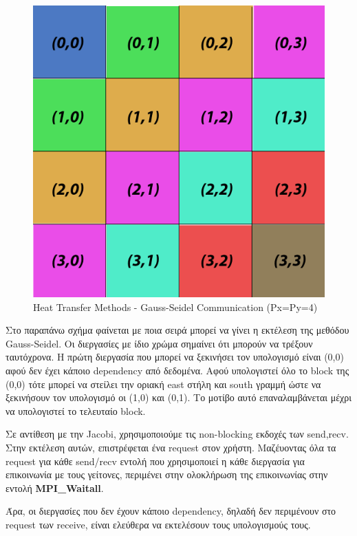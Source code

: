 \documentclass[../final_report.tex]{subfiles}
\begin{document}
\begin{figure}[H]
    \centering
    \includegraphics[scale=0.70]{gauss-seidel-comm.png}
    \caption{Heat Transfer Methods - Gauss-Seidel Communication (Px=Py=4)}
    \label{fig:Heat Transfer Methods - Gauss-Seidel Communication}
\end{figure}

Στο παραπάνω σχήμα φαίνεται με ποια σειρά μπορεί να γίνει η εκτέλεση της μεθόδου Gauss-Seidel. Οι διεργασίες με ίδιο χρώμα σημαίνει ότι μπορούν να τρέξουν ταυτόχρονα.
Η πρώτη διεργασία που μπορεί να ξεκινήσει τον υπολογισμό είναι (0,0) αφού δεν έχει κάποιο dependency από δεδομένα. Αφού υπολογιστεί όλο το block της (0,0) τότε μπορεί
να στείλει την οριακή east στήλη και south γραμμή ώστε να ξεκινήσουν τον υπολογισμό οι (1,0) και (0,1). Το μοτίβο αυτό επαναλαμβάνεται μέχρι να υπολογιστεί το τελευταίο 
block. 

Σε αντίθεση με την Jacobi, χρησιμοποιούμε τις non-blocking εκδοχές των send,recv. Στην εκτέλεση αυτών, επιστρέφεται ένα request στον χρήστη. Μαζέυοντας όλα τα request
για κάθε send/recv εντολή που χρησιμοποιεί η κάθε διεργασία για επικοινωνία με τους γείτονες, περιμένει στην ολοκλήρωση της επικοινωνίας στην εντολή \textbf{MPI\_Waitall}.

Άρα, οι διεργασίες που δεν έχουν κάποιο dependency, δηλαδή δεν περιμένουν στο request των receive, είναι ελεύθερα να εκτελέσουν τους υπολογισμούς τους.
\end{document}
